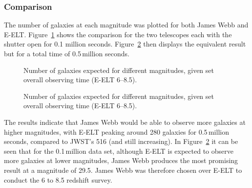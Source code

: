 	\subsubsection{Comparison} %
	\label{sub:comparison}
		The number of galaxies at each magnitude was plotted for both James Webb and E-ELT. Figure~\ref{fig:GRAPH_Mag_vs_galaxies_JWST_ELT_05} shows the comparison for the two telescopes each with the shutter open for 0.1 million seconds. Figure~\ref{fig:GRAPH_Mag_vs_galaxies_JWST_ELT_10} then displays the equivalent result but for a total time of 0.5\,million seconds.
		\begin{figure}[!htbp]
			\centering
				\begingroup{}
					\resizebox{0.8\textwidth}{!}{%
						
					}\endgroup
			\caption{Number of galaxies expected for different magnitudes, given set overall observing time (E-ELT 6--8.5).\label{fig:GRAPH_Mag_vs_galaxies_JWST_ELT_05}}
		\end{figure}
		\begin{figure}[!htbp]
			\centering
				\begingroup{}
					\resizebox{0.8\textwidth}{!}{%
						
					}\endgroup
			\caption{Number of galaxies expected for different magnitudes, given set overall observing time (E-ELT 6--8.5).\label{fig:GRAPH_Mag_vs_galaxies_JWST_ELT_10}}
		\end{figure}

		The results indicate that James Webb would be able to observe more galaxies at higher magnitudes, with E-ELT peaking around 280 galaxies for 0.5\,million seconds, compared to JWST's 516 (and still increasing). In Figure~\ref{fig:GRAPH_Mag_vs_galaxies_JWST_ELT_10} it can be seen that for the 0.1\,million data set, although E-ELT is expected to observe more galaxies at lower magnitudes, James Webb produces the most promising result at a magnitude of 29.5. James Webb was therefore chosen over E-ELT to conduct the 6 to 8.5 redshift survey.

